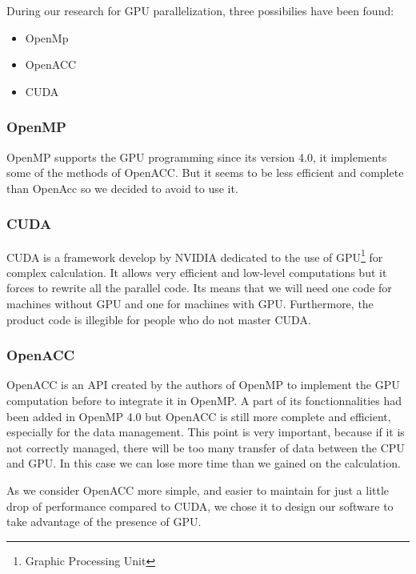 During our research for GPU parallelization, three possibilies have been found:
\begin{itemize}
\item OpenMp
\item OpenACC
\item CUDA
\end{itemize}


\subsubsection{OpenMP}
OpenMP supports the GPU programming since its version 4.0, it implements some of the methods of OpenACC. But it seems to be less efficient and complete than OpenAcc so we decided to avoid to use it.

\subsubsection{CUDA}
CUDA is a framework develop by NVIDIA dedicated to the use of GPU\footnote{Graphic Processing Unit} for complex calculation. It allows very efficient and low-level computations but it forces to rewrite all the parallel code. Its means that we will need one code for machines without GPU and one for machines with GPU. Furthermore, the product code is illegible for people who do not master CUDA.

\subsubsection{OpenACC}
OpenACC is an API created by the authors of OpenMP to implement the GPU computation before to integrate it in OpenMP. A part of its fonctionnalities had been added in OpenMP 4.0 but OpenACC is still more complete and efficient, especially for the data management. This point is very important, because if it is not correctly managed, there will be too many transfer of data between the CPU and GPU. In this case we can lose more time than we gained on the calculation. 

As we consider OpenACC more simple, and easier to maintain for just a little drop of performance compared to CUDA, we chose it to design our software to take advantage of the presence of GPU.